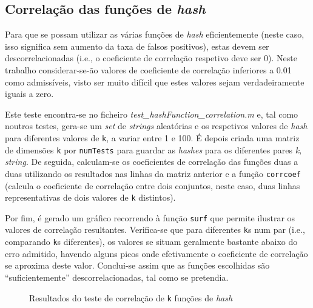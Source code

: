\documentclass[a4paper,11pt,openright,oneside]{report}
\begin{document}
\subsection{Correlação das funções de \textit{hash}}
\label{subsec.hashcorr}

Para que se possam utilizar as várias funções de \textit{hash} eficientemente (neste caso, isso significa sem aumento da taxa de falsos positivos), estas devem ser descorrelacionadas (i.e., o coeficiente de correlação respetivo deve ser 0). Neste trabalho considerar-se-ão valores de coeficiente de correlação inferiores a 0.01 como admissíveis, visto ser muito difícil que estes valores sejam verdadeiramente iguais a zero.

Este teste encontra-se no ficheiro \textit{test\_hashFunction\_correlation.m} e, tal como noutros testes, gera-se um \textit{set} de \textit{strings} aleatórias e os respetivos valores de \textit{hash} para diferentes valores de \texttt{k}, a variar entre 1 e 100. É depois criada uma matriz de dimensões \texttt{k} por \texttt{numTests} para guardar as \textit{hashes} para os diferentes pares \textit{k, string}. De seguida, calculam-se os coeficientes de correlação das funções duas a duas utilizando os resultados nas linhas da matriz anterior e a função \texttt{corrcoef} (calcula o coeficiente de correlação entre dois conjuntos, neste caso, duas linhas representativas de dois valores de \texttt{k} distintos).

Por fim, é gerado um gráfico recorrendo à função \texttt{surf} que permite ilustrar os valores de correlação resultantes. Verifica-se que para diferentes \texttt{k}s num par (i.e., comparando \texttt{k}s diferentes), os valores se situam geralmente bastante abaixo do erro admitido, havendo alguns picos onde efetivamente o coeficiente de correlação se aproxima deste valor. Conclui-se assim que as funções escolhidas são ``suficientemente'' descorrelacionadas, tal como se pretendia.

\begin{figure}[ht]
\center
{}
\caption{Resultados do teste de correlação de \texttt{k} funções de \textit{hash}}
\label{fig:hashcorr}
\end{figure}
\end{document}
